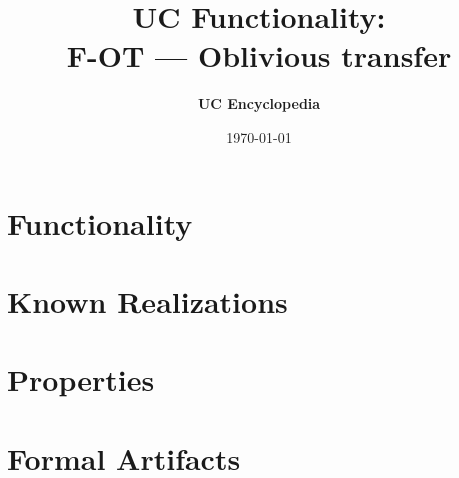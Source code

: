 \documentclass[11pt,a4paper]{article}
\title{\textbf{\Large UC Functionality:}\\[0.2em] \Large F-OT --- Oblivious transfer}
\author{\textbf{UC Encyclopedia}}
\date{\today}
\newtheorem{functionality}{Functionality}
\begin{document}
\maketitle

\begin{abstract}
\end{abstract}

\section{Functionality}

%

\section{Known Realizations}


\section{Properties}


\section{Formal Artifacts}

\end{document}
